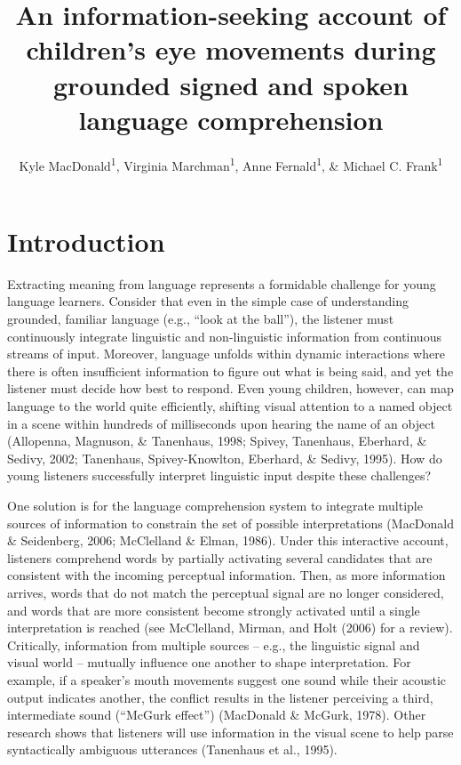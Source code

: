 \documentclass[english,floatsintext,man]{apa6}
\title{An information-seeking account of children's eye movements during
grounded signed and spoken language comprehension}
\author{Kyle MacDonald\textsuperscript{1}, Virginia Marchman\textsuperscript{1}, Anne Fernald\textsuperscript{1}, \& Michael C. Frank\textsuperscript{1}}
\affiliation{
    \vspace{0.5cm}
          \textsuperscript{1} Stanford University  }
\begin{document}
\maketitle

\setcounter{secnumdepth}{0}



\hypertarget{introduction}{%
\section{Introduction}\label{introduction}}

Extracting meaning from language represents a formidable challenge for
young language learners. Consider that even in the simple case of
understanding grounded, familiar language (e.g., \enquote{look at the
ball}), the listener must continuously integrate linguistic and
non-linguistic information from continuous streams of input. Moreover,
language unfolds within dynamic interactions where there is often
insufficient information to figure out what is being said, and yet the
listener must decide how best to respond. Even young children, however,
can map language to the world quite efficiently, shifting visual
attention to a named object in a scene within hundreds of milliseconds
upon hearing the name of an object (Allopenna, Magnuson, \& Tanenhaus,
1998; Spivey, Tanenhaus, Eberhard, \& Sedivy, 2002; Tanenhaus,
Spivey-Knowlton, Eberhard, \& Sedivy, 1995). How do young listeners
successfully interpret linguistic input despite these challenges?

One solution is for the language comprehension system to integrate
multiple sources of information to constrain the set of possible
interpretations (MacDonald \& Seidenberg, 2006; McClelland \& Elman,
1986). Under this interactive account, listeners comprehend words by
partially activating several candidates that are consistent with the
incoming perceptual information. Then, as more information arrives,
words that do not match the perceptual signal are no longer considered,
and words that are more consistent become strongly activated until a
single interpretation is reached (see McClelland, Mirman, and Holt
(2006) for a review). Critically, information from multiple sources --
e.g., the linguistic signal and visual world -- mutually influence one
another to shape interpretation. For example, if a speaker's mouth
movements suggest one sound while their acoustic output indicates
another, the conflict results in the listener perceiving a third,
intermediate sound (\enquote{McGurk effect}) (MacDonald \& McGurk,
1978). Other research shows that listeners will use information in the
visual scene to help parse syntactically ambiguous utterances (Tanenhaus
et al., 1995).
\end{document}
